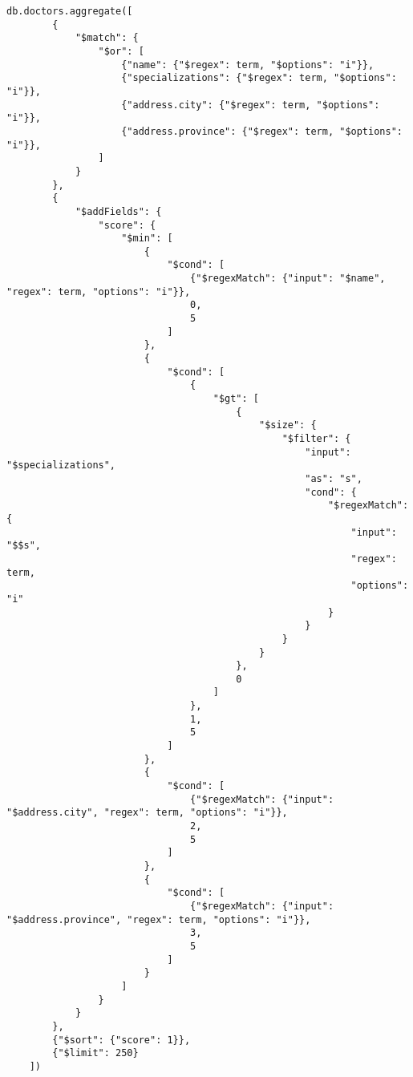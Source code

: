 \begin{lstlisting}[language=mongodb, caption={MongoDB aggregation pipeline for searching doctors with regex}]
db.doctors.aggregate([
        {
            "$match": {
                "$or": [
                    {"name": {"$regex": term, "$options": "i"}},
                    {"specializations": {"$regex": term, "$options": "i"}},
                    {"address.city": {"$regex": term, "$options": "i"}},
                    {"address.province": {"$regex": term, "$options": "i"}},
                ]
            }
        },
        {
            "$addFields": {
                "score": {
                    "$min": [
                        {
                            "$cond": [
                                {"$regexMatch": {"input": "$name", "regex": term, "options": "i"}},
                                0,
                                5
                            ]
                        },
                        {
                            "$cond": [
                                {
                                    "$gt": [
                                        {
                                            "$size": {
                                                "$filter": {
                                                    "input": "$specializations",
                                                    "as": "s",
                                                    "cond": {
                                                        "$regexMatch": {
                                                            "input": "$$s",
                                                            "regex": term,
                                                            "options": "i"
                                                        }
                                                    }
                                                }
                                            }
                                        },
                                        0
                                    ]
                                },
                                1,
                                5
                            ]
                        },
                        {
                            "$cond": [
                                {"$regexMatch": {"input": "$address.city", "regex": term, "options": "i"}},
                                2,
                                5
                            ]
                        },
                        {
                            "$cond": [
                                {"$regexMatch": {"input": "$address.province", "regex": term, "options": "i"}},
                                3,
                                5
                            ]
                        }
                    ]
                }
            }
        },
        {"$sort": {"score": 1}},
        {"$limit": 250}
    ])
\end{lstlisting}